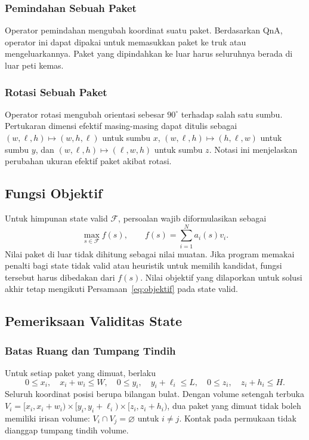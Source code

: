 \documentclass[11pt,a4paper]{article}
\begin{document}
\subsubsection{Pemindahan Sebuah Paket}
Operator pemindahan mengubah koordinat suatu paket. Berdasarkan QnA, operator
ini dapat dipakai untuk memasukkan paket ke truk atau mengeluarkannya.
Paket yang dipindahkan ke luar harus seluruhnya berada di luar peti kemas.

\subsubsection{Rotasi Sebuah Paket}
Operator rotasi mengubah orientasi sebesar $90^\circ$ terhadap salah satu
sumbu. Pertukaran dimensi efektif masing-masing dapat ditulis sebagai
$(w,\ell,h)\mapsto(w,h,\ell)$ untuk sumbu $x$,
$(w,\ell,h)\mapsto(h,\ell,w)$ untuk sumbu $y$, dan
$(w,\ell,h)\mapsto(\ell,w,h)$ untuk sumbu $z$. Notasi ini menjelaskan perubahan ukuran efektif paket akibat rotasi.


\subsection{Fungsi Objektif}
Untuk himpunan state valid $\mathcal{F}$, persoalan wajib diformulasikan sebagai
\begin{equation}
 \max_{s\in\mathcal{F}} f(s),\qquad
 f(s)=\sum_{i=1}^{N}a_i(s)v_i.\label{eq:objektif}
\end{equation}
Nilai paket di luar tidak dihitung sebagai nilai muatan. Jika program memakai
penalti bagi state tidak valid atau heuristik untuk memilih kandidat, fungsi
tersebut harus dibedakan dari $f(s)$. Nilai objektif yang dilaporkan untuk
solusi akhir tetap mengikuti Persamaan~\eqref{eq:objektif} pada state valid.

\subsection{Pemeriksaan Validitas State}\label{sec:validasi}
\subsubsection{Batas Ruang dan Tumpang Tindih}
Untuk setiap paket yang dimuat, berlaku
\begin{equation}
 0\leq x_i,\quad x_i+w_i\leq W,\quad
 0\leq y_i,\quad y_i+\ell_i\leq L,\quad
 0\leq z_i,\quad z_i+h_i\leq H.
\end{equation}
Seluruh koordinat posisi berupa bilangan bulat. Dengan volume setengah
terbuka $V_i=[x_i,x_i+w_i)\times[y_i,y_i+\ell_i)\times[z_i,z_i+h_i)$,
dua paket yang dimuat tidak boleh memiliki irisan volume:
$V_i\cap V_j=\varnothing$ untuk $i\ne j$. Kontak pada permukaan tidak
dianggap tumpang tindih volume.
\end{document}
